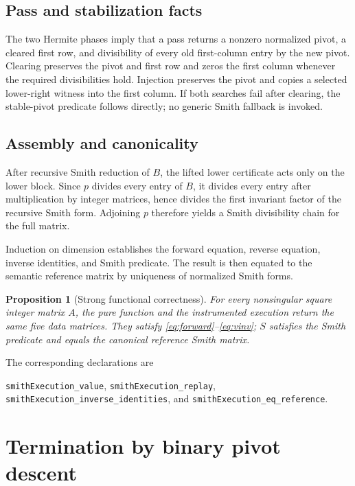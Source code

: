 \documentclass[11pt]{article}
\newtheorem{proposition}[theorem]{Proposition}
\theoremstyle{definition}
\newcommand{\decl}[1]{\nolinkurl{#1}}
\begin{document}
\subsection{Pass and stabilization facts}

The two Hermite phases imply that a pass returns a nonzero normalized pivot, a cleared first row, and divisibility of every old first-column entry by the new pivot.  Clearing preserves the pivot and first row and zeros the first column whenever the required divisibilities hold.  Injection preserves the pivot and copies a selected lower-right witness into the first column.  If both searches fail after clearing, the stable-pivot predicate follows directly; no generic Smith fallback is invoked.

\subsection{Assembly and canonicality}

After recursive Smith reduction of $B$, the lifted lower certificate acts only on the lower block.  Since $p$ divides every entry of $B$, it divides every entry after multiplication by integer matrices, hence divides the first invariant factor of the recursive Smith form.  Adjoining $p$ therefore yields a Smith divisibility chain for the full matrix.

Induction on dimension establishes the forward equation, reverse equation, inverse identities, and Smith predicate.  The result is then equated to the semantic reference matrix by uniqueness of normalized Smith forms.

\begin{proposition}[Strong functional correctness]
For every nonsingular square integer matrix $A$, the pure function and the instrumented execution return the same five data matrices.  They satisfy \eqref{eq:forward}--\eqref{eq:vinv}; $S$ satisfies the Smith predicate and equals the canonical reference Smith matrix.
\end{proposition}

The corresponding declarations are
\begin{center}
\small
\decl{smithExecution_value}, \decl{smithExecution_replay},\\
\decl{smithExecution_inverse_identities}, and
\decl{smithExecution_eq_reference}.
\end{center}

\section{Termination by binary pivot descent}
\label{sec:termination}
\end{document}
